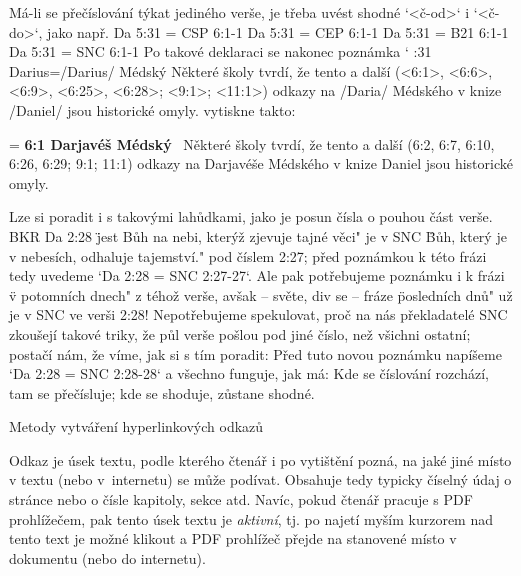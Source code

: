 Má-li se přečíslování týkat jediného verše, je třeba uvést shodné `<č-od>` i `<č-do>`, jako např. 
\begtt
\renum Da 5:31 = CSP 6:1-1
\renum Da 5:31 = CEP 6:1-1
\renum Da 5:31 = B21 6:1-1
\renum Da 5:31 = SNC 6:1-1
\endtt
Po takové deklaraci se nakonec poznámka 
\begtt \catcode`
:31 {Darius}={\x/Darius/ Médský} Některé školy tvrdí, že tento a další 
   (<6:1>, <6:6>, <6:9>, <6:25>, <6:28>; <9:1>; <11:1>)     
   odkazy na \x/Daria/ Médského v knize \x/Daniel/ jsou historické omyly.
\endtt
vytiskne takto:

{\medskip \leftskip=\parindent \noindent
{\bf 6:1 Darjavéš Médský} \ Některé školy tvrdí, že tento a další 
(6:2, 6:7, 6:10, 6:26, 6:29; 9:1; 11:1)     
odkazy na Darjavéše Médského v knize Daniel jsou historické omyly.
\medskip}

Lze si poradit i s takovými lahůdkami, jako je posun čísla o pouhou část verše.
BKR Da 2:28 \"jest Bůh na nebi, kterýž zjevuje tajné věci" je v SNC \"Bůh, který je v nebesích, odhaluje tajemství." pod číslem 2:27;
před poznámkou k této frázi tedy uvedeme `\renum Da 2:28 = SNC 2:27-27`. 
Ale pak potřebujeme poznámku i k frázi \"v potomních dnech" z téhož verše, avšak -- světe, div se -- fráze \"posledních dnů" už
je v SNC ve verši 2:28! Nepotřebujeme spekulovat, proč na nás překladatelé SNC zkoušejí takové triky, že půl verše pošlou pod jiné číslo, než všichni ostatní;
postačí nám, že víme, jak si s tím poradit: 
Před tuto novou poznámku  napíšeme `\renum Da 2:28 = SNC 2:28-28` a všechno funguje, jak má: Kde se číslování rozchází, tam se přečísluje; kde se
shoduje, zůstane shodné.



\sec[odkazy] Metody vytváření hyperlinkových odkazů

Odkaz je úsek textu, podle kterého čtenář i po vytištění pozná, na jaké jiné místo
v textu (nebo v~internetu) se může podívat. Obsahuje tedy typicky číselný údaj o
stránce nebo o čísle kapitoly, sekce atd. Navíc, pokud čtenář pracuje s PDF
prohlížečem, pak tento úsek textu je {\em aktivní}, tj. po najetí myším
kurzorem nad tento text je možné klikout a PDF prohlížeč přejde na stanovené
místo v dokumentu (nebo do internetu).

